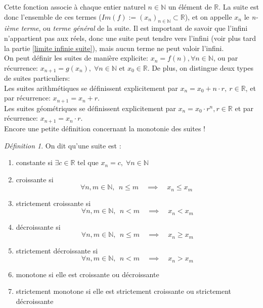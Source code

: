 \documentclass[oneside,12pt,french,table]{book}
\theoremstyle{definition}
\theoremstyle{plain}
\theoremstyle{remark}
\newtheorem{defi}[definition]{Définition}
\newcommand{\Nn}{{\mathbb{N}}}
\newcommand{\Rr}{{\mathbb{R}}}
\begin{document}
Cette fonction associe à chaque entier naturel $n\in\Nn$ un élément de $\Rr$. La suite est donc l'ensemble de ces termes ($Im(f):=(x_n)_{n\in\Nn}\subset \Rr$), et on appelle $x_n$ le \textit{n-ième terme}, ou \textit{terme général} de la suite. Il est important de savoir que l'infini n'appartient pas aux réels, donc une suite peut tendre vers l'infini (voir plus tard la partie \ref{limite infinie suite}), mais aucun terme ne peut valoir l'infini.\\

On peut définir les suites de manière explicite: 
$x_n=f(n), \forall n\in\Nn$, ou par récurrence:
$ x_{n+1}=g(x_n), \; \forall n \in \Nn \text{ et } x_0 \in \Rr$.
De plus, on distingue deux types de suites particuliers:
\\Les suites arithmétiques se définissent explicitement par $x_n=x_0+n\cdot r, ~r\in\Rr$, et par récurrence: $x_{n+1}=x_n+r$.
\\Les suites géométriques se définissent explicitement par 
$x_n=x_0\cdot r^n, r\in\Rr$ et par récurrence: $x_{n+1}=x_n\cdot r$.\\


Encore une petite définition concernant la monotonie des suites !

\begin{defi}
    On dit qu'une suite est :
    \begin{enumerate}
        \item constante si $\exists c\in \Rr $ tel que $x_n=c, \; \forall n \in \Nn $
        \item croissante si
        \[\forall n,m \in \Nn, ~~n\leq m\quad\implies\quad x_n\leq x_m \;  \]
        \item strictement croissante si
        \[\forall n,m \in \Nn, ~~n< m\quad\implies\quad x_n< x_m \]
        \item décroissante si
        \[\forall n,m \in \Nn, ~~n\leq m\quad\implies\quad x_n\geq x_m\]
        \item strictement décroissante si
        \[\forall n,m \in \Nn, ~~n< m\quad\implies\quad x_n> x_m \]
        \item monotone si elle est croissante ou décroissante
        \item strictement monotone si elle est strictement croissante ou strictement décroissante
    \end{enumerate}
\end{defi}
\end{document}
